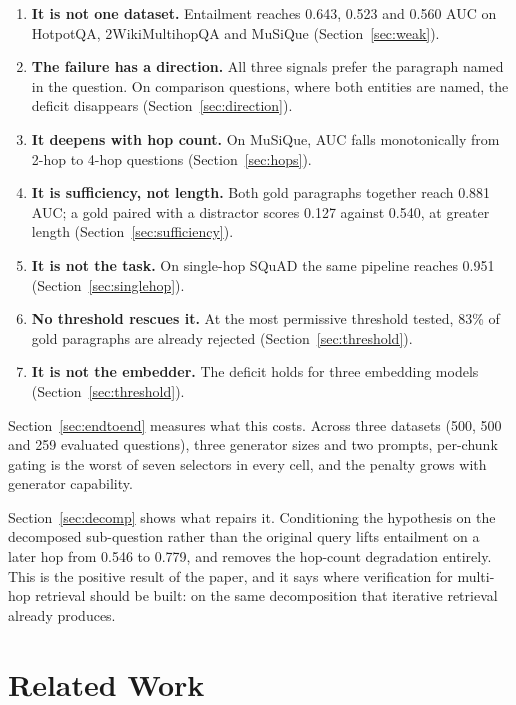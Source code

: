 \documentclass[conference]{IEEEtran}
\begin{document}
\begin{enumerate}\itemsep2pt
  \item \textbf{It is not one dataset.} Entailment reaches 0.643, 0.523 and
        0.560 AUC on HotpotQA, 2WikiMultihopQA and MuSiQue
        (Section~\ref{sec:weak}).
  \item \textbf{The failure has a direction.} All three signals prefer the
        paragraph named in the question. On comparison questions, where both
        entities are named, the deficit disappears
        (Section~\ref{sec:direction}).
  \item \textbf{It deepens with hop count.} On MuSiQue, AUC falls monotonically
        from 2-hop to 4-hop questions (Section~\ref{sec:hops}).
  \item \textbf{It is sufficiency, not length.} Both gold paragraphs together
        reach 0.881 AUC; a gold paired with a distractor scores 0.127 against
        0.540, at greater length (Section~\ref{sec:sufficiency}).
  \item \textbf{It is not the task.} On single-hop SQuAD the same pipeline
        reaches 0.951 (Section~\ref{sec:singlehop}).
  \item \textbf{No threshold rescues it.} At the most permissive threshold
        tested, 83\% of gold paragraphs are already rejected
        (Section~\ref{sec:threshold}).
  \item \textbf{It is not the embedder.} The deficit holds for three embedding
        models (Section~\ref{sec:threshold}).
\end{enumerate}

Section~\ref{sec:endtoend} measures what this costs. Across three datasets (500, 500 and 259 evaluated questions),
three generator sizes and two prompts, per-chunk gating is the worst of seven
selectors in every cell, and the penalty grows with generator capability.

Section~\ref{sec:decomp} shows what repairs it. Conditioning the hypothesis on
the decomposed sub-question rather than the original query lifts entailment on a
later hop from 0.546 to 0.779, and removes the hop-count degradation entirely.
This is the positive result of the paper, and it says where verification for
multi-hop retrieval should be built: on the same decomposition that iterative
retrieval already produces.

\section{Related Work}
\label{sec:related}
\end{document}
